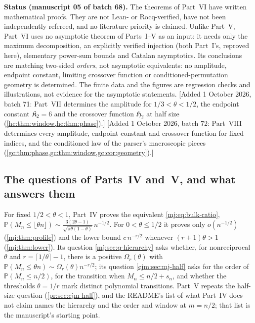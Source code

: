 \documentclass[11pt,a4paper]{article}
\theoremstyle{definition}\newaliascnt{definition}{theorem}
\theoremstyle{remark}\newaliascnt{remark}{theorem}
\newcommand{\ljP}{\mathbb P}
\begin{document}
\begin{resultbox}
\textbf{Status (manuscript 05 of batch 68).} The theorems of Part~VI have
written mathematical proofs. They are not Lean- or Rocq-verified, have not
been independently refereed, and no literature priority is claimed. Unlike
Part~V, Part~VI uses no asymptotic theorem of Parts~I--V as an input: it
needs only the maximum decomposition, an explicitly verified injection
(both Part~I's, reproved here), elementary power-sum bounds and Catalan
asymptotics. Its conclusions are matching two-sided \emph{orders}, not
asymptotic equivalents: no amplitude, endpoint constant, limiting crossover
function or conditioned-permutation geometry is determined. The finite data
and the figures are regression checks and illustrations, not evidence for
the asymptotic statements. [Added 1 October 2026, batch 71: Part~VII
determines the amplitude for $1/3<\theta<1/2$, the endpoint constant
$\mathfrak K_2=6$ and the crossover function $\mathfrak H_2$ at half size
(\cref{hc:thm:window,hc:thm:phase}).] [Added 1 October 2026, batch 72: Part~VIII
determines every amplitude, endpoint constant and crossover function for fixed
indices, and the conditioned law of the parser's macroscopic pieces
(\cref{gc:thm:phase,gc:thm:window,gc:cor:geometry}).]
\end{resultbox}

\subsection{The questions of Parts~IV and~V, and what answers them}
\label{pr:sec:answer}
For fixed $1/2<\theta<1$, Part~IV proves the equivalent
\eqref{mj:eq:bulk-ratio},
$\ljP(M_n\le\lfloor\theta n\rfloor)\sim
\frac{3(2\theta-1)}{\sqrt{\pi\theta(1-\theta)}}\,n^{-1/2}$. For
$0<\theta\le1/2$ it proves only $o(n^{-1/2})$ (\cref{mj:thm:profile}) and
the lower bound $c\,n^{-r/2}$ whenever $(r+1)\theta>1$
(\cref{mj:thm:lower}). Its question \cref{mj:sec:q-hierarchy} asks whether,
for nonreciprocal $\theta$ and $r=\lceil1/\theta\rceil-1$, there is a positive
$\Omega_r(\theta)$ with $\ljP(M_n\le\theta n)\sim\Omega_r(\theta)n^{-r/2}$;
its question \cref{cjm:sec:mj-half} asks for the order of $\ljP(M_n\le n/2)$,
for the transition when $M_n\le n/2+s_n$, and whether the thresholds
$\theta=1/r$ mark distinct polynomial transitions. Part~V repeats the
half-size question (\cref{pr:sec:cjm-half}), and the README's list of what
Part~IV does not claim names the hierarchy and the order and window at
$m=n/2$; that list is the manuscript's starting point.
\end{document}

